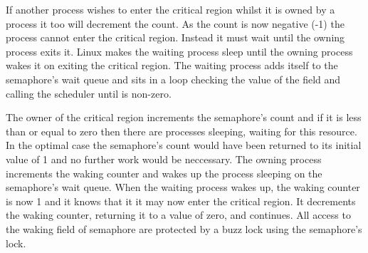 If another process wishes to enter the critical region whilst it is owned by a 
process it too will decrement the count.
As the count is now negative (-1) the process cannot enter the critical region.
Instead it must wait until the owning process exits it.
Linux makes the waiting process sleep until the owning process wakes it on exiting
the critical region.
The waiting process adds itself to the semaphore's wait queue and sits in a loop
checking the value of the  field and calling the scheduler until 
 is non-zero.

The owner of the critical region increments the semaphore's count and if it is less
than or equal to zero then there are processes sleeping, waiting for this resource.
In the optimal case the semaphore's count would have been returned to its initial
value of 1 and no further work would be neccessary.
The owning process increments the waking counter and wakes up the process sleeping on
the semaphore's wait queue.
When the waiting process wakes up, the waking counter is now 1 and it knows that it
it may now enter the critical region.
It decrements the waking counter, returning it to a value of zero, and continues.
All access to the waking field of semaphore are protected by a buzz lock using the semaphore's
lock.


